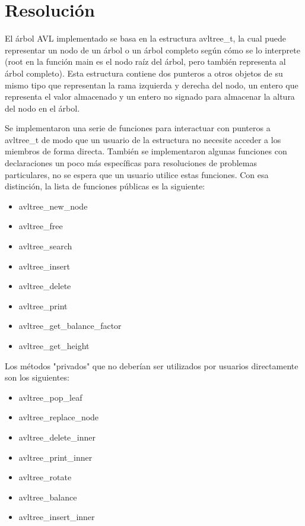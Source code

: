 \documentclass[a4paper,notitlepage]{article}
\begin{document}
\tableofcontents
\section{Resolución}
El árbol AVL implementado se basa en la estructura avltree{\_}t, la cual puede
representar un nodo de un árbol o un árbol completo según cómo se lo interprete
(root en la función main es el nodo raíz del árbol, pero también representa al
árbol completo). Esta estructura contiene dos punteros a otros objetos de su
mismo tipo que representan la rama izquierda y derecha del nodo, un entero que
representa el valor almacenado y un entero no signado para almacenar la altura
del nodo en el árbol.

Se implementaron una serie de funciones para interactuar con punteros a
avltree{\_}t de modo que un usuario de la estructura no necesite acceder a los
miembros de forma directa. También se implementaron algunas funciones con
declaraciones un poco más específicas para resoluciones de problemas
particulares, no se espera que un usuario utilice estas funciones. Con esa
distinción, la lista de funciones públicas es la siguiente:

\begin{itemize}
    \item avltree{\_}new{\_}node
    \item avltree{\_}free
    \item avltree{\_}search
    \item avltree{\_}insert
    \item avltree{\_}delete
    \item avltree{\_}print
    \item avltree{\_}get{\_}balance{\_}factor
    \item avltree{\_}get{\_}height
\end{itemize}

Los métodos "privados" que no deberían ser utilizados por usuarios directamente
son los siguientes:

\begin{itemize}
    \item avltree{\_}pop{\_}leaf
    \item avltree{\_}replace{\_}node
    \item avltree{\_}delete{\_}inner
    \item avltree{\_}print{\_}inner
    \item avltree{\_}rotate
    \item avltree{\_}balance
    \item avltree{\_}insert{\_}inner
\end{itemize}
\end{document}
